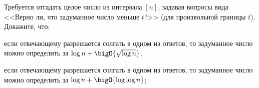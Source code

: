 Требуется отгадать целое число из интервала $[n]$, задавая вопросы вида <<Верно ли, что задуманное число
меньше $t$?>> (для произвольной границы $t$). Докажите, что:
\begin{enumcyr}
    \item если отвечающему разрешается солгать в одном из ответов, то задуманное число
        можно определить за $\log n + \bigO{\sqrt{\log n}}$;
    \item если отвечающему разрешается солгать в одном из ответов, то задуманное число
        можно определить за $\log n + \bigO{\log\log n}$;
\end{enumcyr}